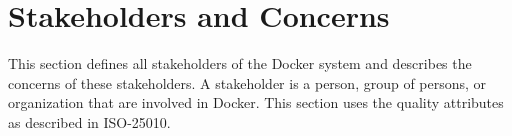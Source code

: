 
\clearpage
\chapter{Stakeholders and Concerns}
\label{ch:stakeholders}
This section defines all stakeholders of the Docker system and describes the concerns of these stakeholders. A stakeholder is a person, group of persons, or organization that are involved in Docker. This section uses the quality attributes as described in ISO-25010\cite{iso25010}.


%



